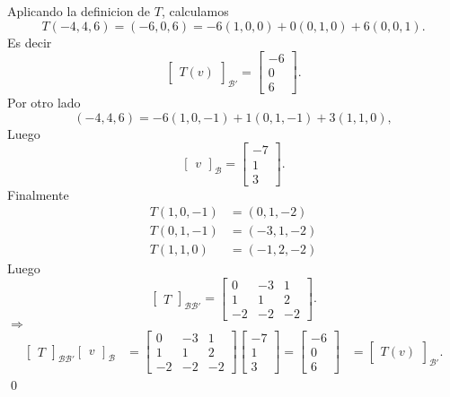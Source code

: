 \documentclass{article}
\theoremstyle{definition}
\theoremstyle{definition}
\theoremstyle{remark}
\begin{document}
Aplicando la definicion de $T$, calculamos \[
T(-4,4,6)=(-6,0,6)=-6(1,0,0)+0(0,1,0)+6(0,0,1).
\]
Es decir \begin{equation}
  \begin{bmatrix} T(v) \end{bmatrix}_{\mathcal{B}'}=\begin{bmatrix}-6 \\ 0 \\ 6 \end{bmatrix}.  \tag{1}
\end{equation}
Por otro lado \[
  (-4,4,6)=-6(1,0,-1)+1(0,1,-1)+3(1,1,0),
\]
Luego \begin{equation}
  \begin{bmatrix}
v
\end{bmatrix}_{\mathcal{B}}=\begin{bmatrix}-7 \\ 1 \\ 3\end{bmatrix}. \tag{2}
\end{equation}
Finalmente \[
  \begin{aligned}
    T(1,0,-1) &= (0,1,-2) \\
    T(0,1,-1) &= (-3,1,-2) \\
    T(1,1,0) &= (-1,2,-2) 
  \end{aligned}
\]
Luego \begin{equation}
  \begin{bmatrix}
T
\end{bmatrix}_{\mathcal{B}\mathcal{B'}}=\begin{bmatrix} 0 &  -3 & 1 \\ 1 & 1 & 2 \\ -2 & -2 & -2 \end{bmatrix}. 
\tag{3}
\end{equation}
$\Rightarrow$
\[ 
  \begin{aligned}
  \begin{bmatrix}
T
\end{bmatrix}_{\mathcal{B}\mathcal{B'}} 
\begin{bmatrix} v \end{bmatrix}_{\mathcal{B}}
&=
\begin{bmatrix}
0 & -3 & 1 \\ 1 & 1 & 2 \\ -2 & -2 & -2 
\end{bmatrix}
  \begin{bmatrix}-7 \\ 1 \\ 3 \end{bmatrix} 
  =
  \begin{bmatrix}-6 \\ 0 \\ 6 \end{bmatrix}
                    &=
                    \begin{bmatrix} T(v) \end{bmatrix}_\mathcal{B'}.
\end{aligned}
\]
\qed \pagebreak
\end{document}
